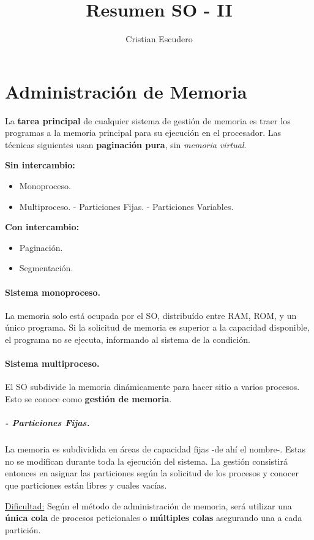 \documentclass[10pt,a4paper]{article}
\author{Cristian Escudero}
\title{Resumen SO - II}
\begin{document}
\maketitle
\section{Administración de Memoria}
La \textbf{tarea principal} de cualquier sistema de gestión de memoria es traer los programas a la memoria principal para su ejecución en el procesador. Las técnicas siguientes usan \textbf{paginación pura}, sin \textit{memoria virtual}.

\begin{multicols}{2} 
\textbf{Sin intercambio:}
\begin{itemize}
\item Monoproceso.
\item Multiproceso.
\subitem - Particiones Fijas.
\subitem - Particiones Variables.
\end{itemize}
\columnbreak
\textbf{Con intercambio:}
\begin{itemize}
\item Paginación.
\item Segmentación.
\subitem $ $
\subitem $ $
\end{itemize}
\end{multicols}
 
\paragraph{Sistema monoproceso.} La memoria solo está ocupada por el SO, distribuído entre RAM, ROM, y un único programa. Si la solicitud de memoria es superior a la capacidad disponible, el programa no se ejecuta, informando al sistema de la condición.

\paragraph{Sistema multiproceso.} El SO subdivide la memoria dinámicamente para hacer sitio a varios procesos. Esto se conoce como \textbf{gestión de memoria}.
 
\subparagraph{- Particiones Fijas.} La memoria es subdividida en áreas de capacidad fijas -de ahí el nombre-. Estas no se modifican durante toda la ejecución del sistema. La gestión consistirá entonces en asignar las particiones según la solicitud de los procesos y conocer que particiones están libres y cuales vacías.

\underline{Dificultad:} Según el método de administración de memoria, será utilizar una \textbf{única cola} de procesos peticionales o \textbf{múltiples colas} asegurando una a cada partición.
\end{document}

